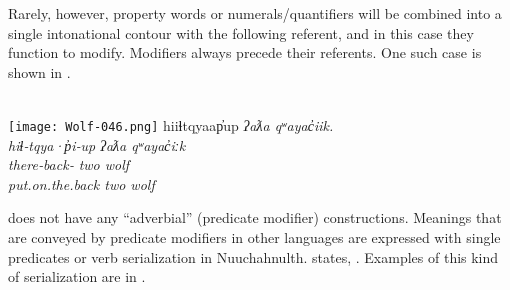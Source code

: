 \noindent Rarely, however, property words or numerals/quantifiers will be combined into a single intonational contour with the following referent, and in this case they function to modify. Modifiers always precede their referents. One such case is shown in .

\clearpage

\begin{exe}
  \ex\label{ex:3.16}
  \\
  \texttt{[image: Wolf-046.png]}
  \gllll hiiɬtqyaap̓up            \em{ʔaƛa} qʷayac̓iik.\\
         hiɬ‑tqya·p̓i‑up          \em{ʔaƛa} qʷayac̓iːk\\
         there‑back‑ \em{two}  wolf\\
         put.on.the.back         \em{two}  wolf\\
         \vfix
\end{exe}

 does not have any \enquote{adverbial} (predicate modifier) constructions. Meanings that are conveyed by predicate modifiers in other languages are expressed with single predicates or verb serialization in Nuuchahnulth. \citeauthor{Nakayama2001} states, . Examples of this kind of serialization are in .


